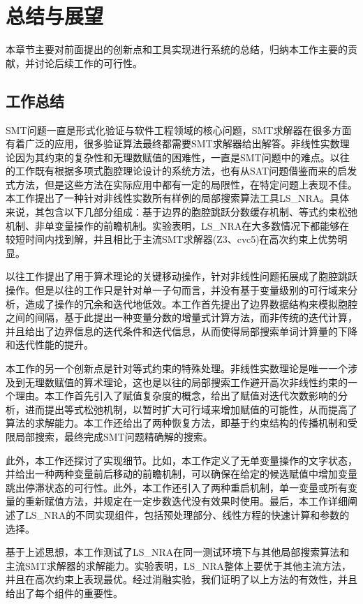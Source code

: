 \chapter{总结与展望}\label{chap:conclusion}

本章节主要对前面提出的创新点和工具实现进行系统的总结，归纳本工作主要的贡献，并讨论后续工作的可行性。

\section{工作总结}
SMT问题一直是形式化验证与软件工程领域的核心问题，SMT求解器在很多方面有着广泛的应用，很多验证算法最终都需要SMT求解器给出解答。非线性实数理论因为其约束的复杂性和无理数赋值的困难性，一直是SMT问题中的难点。以往的工作既有根据多项式胞腔理论设计的系统方法，也有从SAT问题借鉴而来的启发式方法，但是这些方法在实际应用中都有一定的局限性，在特定问题上表现不佳。本工作提出了一种针对非线性实数所有样例的局部搜索算法工具LS\_NRA。具体来说，其包含以下几部分组成：基于边界的胞腔跳跃分数缓存机制、等式约束松弛机制、非单变量操作的前瞻机制。实验表明，LS\_NRA在大多数情况下都能够在较短时间内找到解，并且相比于主流SMT求解器(Z3、cvc5)在高次约束上优势明显。

以往工作提出了用于算术理论的关键移动操作，针对非线性问题拓展成了胞腔跳跃操作。但是以往的工作只是针对单一子句而言，并没有基于变量级别的可行域来分析，造成了操作的冗余和迭代地低效。本工作首先提出了边界数据结构来模拟胞腔之间的间隔，基于此提出一种变量分数的增量式计算方法，而非传统的迭代计算，并且给出了边界信息的迭代条件和迭代信息，从而使得局部搜索单词计算量的下降和迭代性能的提升。

本工作的另一个创新点是针对等式约束的特殊处理。非线性实数理论是唯一一个涉及到无理数赋值的算术理论，这也是以往的局部搜索工作避开高次非线性约束的一个理由。本工作首先引入了赋值复杂度的概念，给出了赋值对迭代次数影响的分析，进而提出等式松弛机制，以暂时扩大可行域来增加赋值的可能性，从而提高了算法的求解能力。本工作还给出了两种恢复方法，即基于约束结构的传播机制和受限局部搜索，最终完成SMT问题精确解的搜索。

此外，本工作还探讨了实现细节。比如，本工作定义了无单变量操作的文字状态，并给出一种两种变量前后移动的前瞻机制，可以确保在给定的候选赋值中增加变量跳出停滞状态的可行性。此外，本工作还引入了两种重启机制，单一变量或所有变量的重新赋值方法，并规定在一定步数迭代没有效果时使用。最后，本工作详细阐述了LS\_NRA的不同实现组件，包括预处理部分、线性方程的快速计算和参数的选择。

基于上述思想，本工作测试了LS\_NRA在同一测试环境下与其他局部搜索算法和主流SMT求解器的求解能力。实验表明，LS\_NRA整体上要优于其他主流方法，并且在高次约束上表现最优。经过消融实验，我们证明了以上方法的有效性，并且给出了每个组件的重要性。

